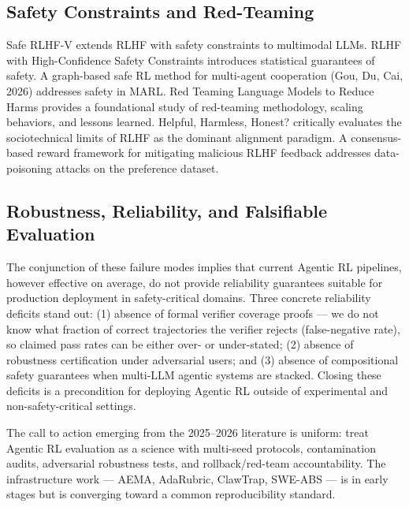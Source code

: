 \documentclass{article}
\begin{document}
\subsection{Safety Constraints and Red-Teaming}\label{safety-constraints-and-red-teaming}

Safe RLHF-V \citep{ji20252025} extends RLHF with safety constraints to multimodal LLMs. RLHF with High-Confidence Safety Constraints \citep{chittepu20252025} introduces statistical guarantees of safety. A graph-based safe RL method for multi-agent cooperation (Gou, Du, Cai, 2026) addresses safety in MARL. Red Teaming Language Models to Reduce Harms \citep{ganguli20222022} provides a foundational study of red-teaming methodology, scaling behaviors, and lessons learned. Helpful, Harmless, Honest? \citep{lindstrm20252025} critically evaluates the sociotechnical limits of RLHF as the dominant alignment paradigm. A consensus-based reward framework for mitigating malicious RLHF feedback \citep{haider20252025} addresses data-poisoning attacks on the preference dataset.

\subsection{Robustness, Reliability, and Falsifiable Evaluation}\label{robustness-reliability-and-falsifiable-evaluation}

The conjunction of these failure modes implies that current Agentic RL pipelines, however effective on average, do not provide reliability guarantees suitable for production deployment in safety-critical domains. Three concrete reliability deficits stand out: (1) absence of formal verifier coverage proofs --- we do not know what fraction of correct trajectories the verifier rejects (false-negative rate), so claimed pass rates can be either over- or under-stated; (2) absence of robustness certification under adversarial users; and (3) absence of compositional safety guarantees when multi-LLM agentic systems are stacked. Closing these deficits is a precondition for deploying Agentic RL outside of experimental and non-safety-critical settings.

The call to action emerging from the 2025--2026 literature is uniform: treat Agentic RL evaluation as a science with multi-seed protocols, contamination audits, adversarial robustness tests, and rollback/red-team accountability. The infrastructure work --- AEMA, AdaRubric, ClawTrap, SWE-ABS --- is in early stages but is converging toward a common reproducibility standard.
\end{document}
